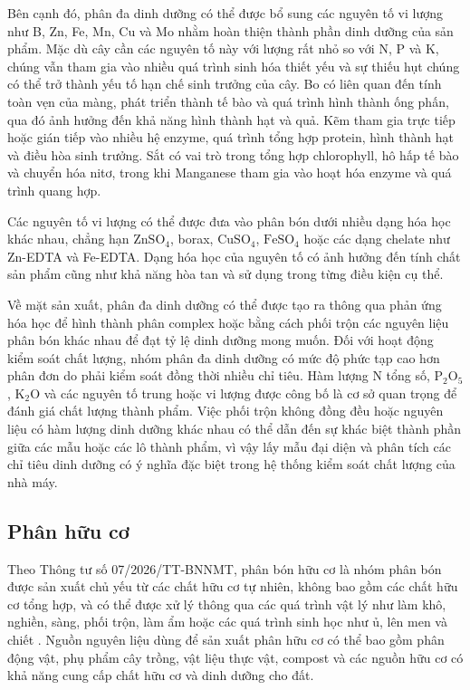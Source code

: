 Bên cạnh đó, phân đa dinh dưỡng có thể được bổ sung các nguyên tố vi lượng như B, Zn, Fe, Mn, Cu và Mo nhằm hoàn thiện thành phần dinh dưỡng của sản phẩm. 
Mặc dù cây cần các nguyên tố này với lượng rất nhỏ so với N, P và K, chúng vẫn tham gia vào nhiều quá trình sinh hóa thiết yếu và sự thiếu hụt chúng có thể trở thành yếu tố hạn chế sinh trưởng của cây.
Bo có liên quan đến tính toàn vẹn của màng, phát triển thành tế bào và quá trình hình thành ống phấn, qua đó ảnh hưởng đến khả năng hình thành hạt và quả. 
Kẽm tham gia trực tiếp hoặc gián tiếp vào nhiều hệ enzyme, quá trình tổng hợp protein, hình thành hạt và điều hòa sinh trưởng. 
Sắt có vai trò trong tổng hợp chlorophyll, hô hấp tế bào và chuyển hóa nitơ, trong khi Manganese tham gia vào hoạt hóa enzyme và quá trình quang hợp.

Các nguyên tố vi lượng có thể được đưa vào phân bón dưới nhiều dạng hóa học khác nhau, chẳng hạn \(\mathrm{ZnSO_4}\), borax, \(\mathrm{CuSO_4}\), \(\mathrm{FeSO_4}\) hoặc các dạng chelate như Zn-EDTA và Fe-EDTA.
Dạng hóa học của nguyên tố có ảnh hưởng đến tính chất sản phẩm cũng như khả năng hòa tan và sử dụng trong từng điều kiện cụ thể.

Về mặt sản xuất, phân đa dinh dưỡng có thể được tạo ra thông qua phản ứng hóa học để hình thành phân complex hoặc bằng cách phối trộn các nguyên liệu phân bón khác nhau để đạt tỷ lệ dinh dưỡng mong muốn. 
Đối với hoạt động kiểm soát chất lượng, nhóm phân đa dinh dưỡng có mức độ phức tạp cao hơn phân đơn do phải kiểm soát đồng thời nhiều chỉ tiêu. 
Hàm lượng N tổng số, \(\mathrm{P_2O_5}\), \(\mathrm{K_2O}\) và các nguyên tố trung hoặc vi lượng được công bố là cơ sở quan trọng để đánh giá chất lượng thành phẩm.
Việc phối trộn không đồng đều hoặc nguyên liệu có hàm lượng dinh dưỡng khác nhau có thể dẫn đến sự khác biệt thành phần giữa các mẫu hoặc các lô thành phẩm, vì vậy lấy mẫu đại diện và phân tích các chỉ tiêu dinh dưỡng có ý nghĩa đặc biệt trong hệ thống kiểm soát chất lượng của nhà máy.

\subsection{Phân hữu cơ}
Theo Thông tư số 07/2026/TT-BNNMT, phân bón hữu cơ là nhóm phân bón được sản xuất chủ yếu từ các chất hữu cơ tự nhiên, không bao gồm các chất hữu cơ tổng hợp, và có thể được xử lý thông qua các quá trình vật lý như làm khô, nghiền, sàng, phối trộn, làm ẩm hoặc các quá trình sinh học như ủ, lên men và chiết \cite{circular-07-2026-fertilizer}.
Nguồn nguyên liệu dùng để sản xuất phân hữu cơ có thể bao gồm phân động vật, phụ phẩm cây trồng, vật liệu thực vật, compost và các nguồn hữu cơ có khả năng cung cấp chất hữu cơ và dinh dưỡng cho đất.

